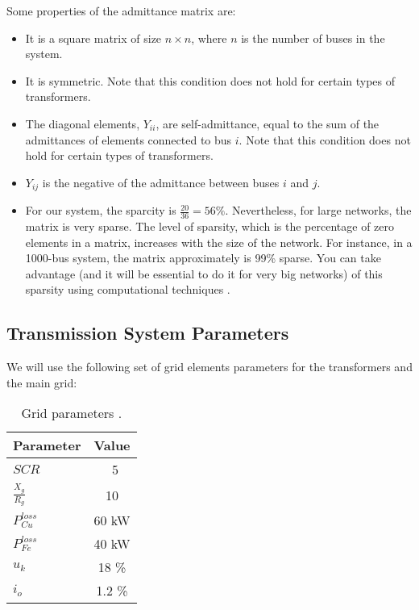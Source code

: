 \documentclass[a4paper,11pt, titlepage, twoside]{article}
\begin{document}
Some properties of the admittance matrix are:
\begin{itemize}[itemsep=0pt]
    \item It is a square matrix of size $n \times n$, where $n$ is the number of buses in the system.
    \item It is symmetric. Note that this condition does not hold for certain types of transformers.
    \item The diagonal elements, $Y_{ii}$, are self-admittance, equal to the sum of the admittances of elements connected to bus $i$. Note that this condition does not hold for certain types of transformers.
    \item $Y_{ij}$ is the negative of the admittance between buses $i$ and $j$.
    \item  For our system, the sparcity is $\frac{20}{36}= 56\%$. Nevertheless, for large networks, the matrix is very sparse. The level of sparsity, which is the percentage of zero elements in a matrix, increases with the size of the network.
    For instance, in a 1000-bus system, the matrix approximately is 99\% sparse. You can take advantage (and it will be essential to do it for very big networks) of this sparsity using computational techniques \cite{sparcity}.
\end{itemize}

\subsection{Transmission System Parameters}

We will use the following set of grid elements parameters for the transformers and the main grid:
\begin{table}[h]
    \centering
    \renewcommand{\arraystretch}{1.2}
    \begin{tabular}{l|c}
    \hline
    \textbf{Parameter} & \textbf{Value} \\
    \hline
    $SCR$ & \ 5 \\
    $\frac{X_g}{R_g}$ & 10 \\
    $P_{Cu}^{loss}$ & 60 kW \\
    $P_{Fe}^{loss}$ & 40 kW \\
    $u_k$ & 18 \%  \\
    $i_o$ & 1.2 \% \\
    \hline
    \end{tabular}
    \caption{Grid parameters \cite{paperbase}.}
    \label{tab:gridparameters}
    \end{table}
\end{document}
